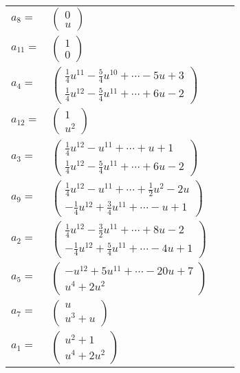 \documentclass[1p]{elsarticle_modified}
\theoremstyle{definition}
\begin{document}
\begin{tabular}{m{7pt} m{180pt} m{7pt} m{180pt} }
\flushright $a_{8}=$&$\begin{pmatrix}0\\u\end{pmatrix}$ \\
\flushright $a_{11}=$&$\begin{pmatrix}1\\0\end{pmatrix}$ \\
\flushright $a_{4}=$&$\begin{pmatrix}\frac{1}{4} u^{11}-\frac{5}{4} u^{10}+\cdots-5 u+3\\\frac{1}{4} u^{12}-\frac{5}{4} u^{11}+\cdots+6 u-2\end{pmatrix}$ \\
\flushright $a_{12}=$&$\begin{pmatrix}1\\u^2\end{pmatrix}$ \\
\flushright $a_{3}=$&$\begin{pmatrix}\frac{1}{4} u^{12}- u^{11}+\cdots+u+1\\\frac{1}{4} u^{12}-\frac{5}{4} u^{11}+\cdots+6 u-2\end{pmatrix}$ \\
\flushright $a_{9}=$&$\begin{pmatrix}\frac{1}{4} u^{12}- u^{11}+\cdots+\frac{1}{2} u^2-2 u\\-\frac{1}{4} u^{12}+\frac{3}{4} u^{11}+\cdots- u+1\end{pmatrix}$ \\
\flushright $a_{2}=$&$\begin{pmatrix}\frac{1}{4} u^{12}-\frac{3}{2} u^{11}+\cdots+8 u-2\\-\frac{1}{4} u^{12}+\frac{5}{4} u^{11}+\cdots-4 u+1\end{pmatrix}$ \\
\flushright $a_{5}=$&$\begin{pmatrix}- u^{12}+5 u^{11}+\cdots-20 u+7\\u^4+2 u^2\end{pmatrix}$ \\
\flushright $a_{7}=$&$\begin{pmatrix}u\\u^3+u\end{pmatrix}$ \\
\flushright $a_{1}=$&$\begin{pmatrix}u^2+1\\u^4+2 u^2\end{pmatrix}$ \\

\end{tabular}
\end{document}
